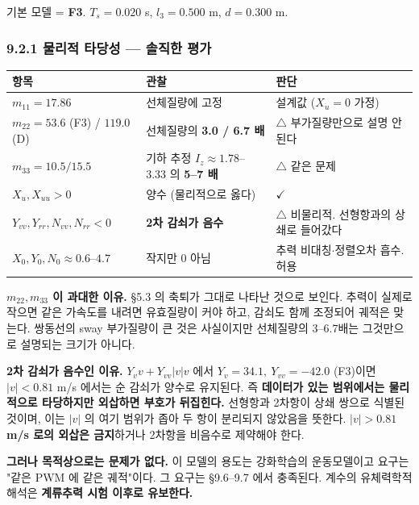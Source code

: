 \documentclass[10pt,a4paper]{article}
\begin{document}
기본 모델 = \textbf{F3}. $T_s = 0.020$ s, $l_3 = 0.500$ m, $d = 0.300$ m.

\subsubsection*{9.2.1 물리적 타당성 --- 솔직한 평가}

\begin{center}\footnotesize\setlength{\tabcolsep}{3pt}
\begin{tabular}{@{}lll@{}}
\toprule
\textbf{항목} & \textbf{관찰} & \textbf{판단} \\
\midrule
$m_{11} = 17.86$ & 선체질량에 고정 & 설계값 ($X_{\dot u} = 0$ 가정) \\
$m_{22} = 53.6$ (F3) / $119.0$ (D) & 선체질량의 \textbf{3.0 / 6.7 배} & $\triangle$ 부가질량만으로 설명 안 된다 \\
$m_{33} = 10.5 / 15.5$ & 기하 추정 $I_z \approx 1.78$--$3.33$ 의 \textbf{5--7 배} & $\triangle$ 같은 문제 \\
$X_u, X_{uu} > 0$ & 양수 (물리적으로 옳다) & $\checkmark$ \\
$Y_{vv}, Y_{rr}, N_{vv}, N_{rr} < 0$ & \textbf{2차 감쇠가 음수} & $\triangle$ 비물리적. 선형항과의 상쇄로 들어갔다 \\
$X_0, Y_0, N_0 \approx 0.6$--$4.7$ & 작지만 0 아님 & 추력 비대칭$\cdot$정렬오차 흡수. 허용 \\
\bottomrule
\end{tabular}
\end{center}

\textbf{$m_{22}, m_{33}$ 이 과대한 이유.} \S{}5.3 의 축퇴가 그대로 나타난 것으로 보인다. 추력이 실제로 작으면 같은 가속도를 내려면 유효질량이 커야 하고, 감쇠도 함께 조정되어 궤적은 맞는다. 쌍동선의 sway 부가질량이 큰 것은 사실이지만 선체질량의 3--6.7배는 그것만으로 설명되는 크기가 아니다.

\textbf{2차 감쇠가 음수인 이유.} $Y_v v + Y_{vv}|v|v$ 에서 $Y_v = 34.1,\ Y_{vv} = -42.0$ (F3)이면 $|v| < 0.81$ m/s 에서는 순 감쇠가 양수로 유지된다. 즉 \textbf{데이터가 있는 범위에서는 물리적으로 타당하지만 외삽하면 부호가 뒤집힌다.} 선형항과 2차항이 상쇄 쌍으로 식별된 것이며, 이는 $|v|$ 의 여기 범위가 좁아 두 항이 분리되지 않았음을 뜻한다. \textbf{$|v| > 0.81$ m/s 로의 외삽은 금지}하거나 2차항을 비음수로 제약해야 한다.

\textbf{그러나 목적상으로는 문제가 없다.} 이 모델의 용도는 강화학습의 운동모델이고 요구는 "같은 PWM 에 같은 궤적"이다. 그 요구는 \S{}9.6--9.7 에서 충족된다. 계수의 유체력학적 해석은 \textbf{계류추력 시험 이후로 유보한다.}
\end{document}
